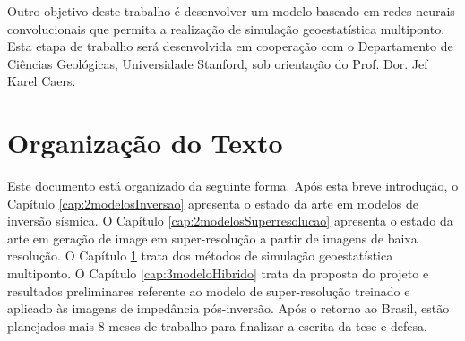Outro objetivo deste trabalho é desenvolver um modelo baseado em redes neurais convolucionais que permita a
realização de simulação geoestatística multiponto. Esta etapa de trabalho será desenvolvida
em cooperação com o Departamento de Ciências Geológicas, Universidade Stanford, sob
orientação do Prof. Dor. Jef Karel Caers.


\section{Organização do Texto}

Este documento está organizado da seguinte forma. Após esta breve introdução, o
Capítulo \ref{cap:2modelosInversao} apresenta o estado da arte em modelos de
inversão sísmica. O Capítulo \ref{cap:2modelosSuperresolucao} apresenta o estado da arte 
em geração de image em super-resolução a partir de imagens de baixa resolução.
O Capítulo \ref{} trata dos métodos de simulação geoestatística multiponto. O
Capítulo \ref{cap:3modeloHibrido} trata da proposta do projeto e resultados
preliminares referente ao modelo de super-resolução treinado e aplicado às imagens
de impedância pós-inversão. Após o retorno ao Brasil, estão planejados mais 8 meses
de trabalho para finalizar a escrita da tese e defesa.

